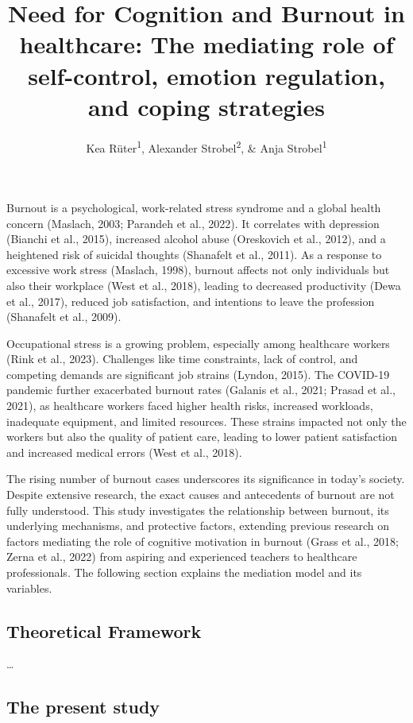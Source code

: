 \documentclass[
  man]{apa6}
\title{Need for Cognition and Burnout in healthcare: The mediating role of self-control, emotion regulation, and coping strategies}
\author{Kea Rüter\textsuperscript{1}, Alexander Strobel\textsuperscript{2}, \& Anja Strobel\textsuperscript{1}}
\date{}
\affiliation{\vspace{0.5cm}\textsuperscript{1} Department of Psychology, Technische Universität Chemnitz, Chemnitz, Germany\\\textsuperscript{2} Faculty of Psychology, Technische Universität Dresden, Dresden, Germany}
\begin{document}
\maketitle

Burnout is a psychological, work-related stress syndrome and a global health concern (Maslach, 2003; Parandeh et al., 2022).
It correlates with depression (Bianchi et al., 2015), increased alcohol abuse (Oreskovich et al., 2012), and a heightened risk of suicidal thoughts (Shanafelt et al., 2011).
As a response to excessive work stress (Maslach, 1998), burnout affects not only individuals but also their workplace (West et al., 2018), leading to decreased productivity (Dewa et al., 2017), reduced job satisfaction, and intentions to leave the profession (Shanafelt et al., 2009).

Occupational stress is a growing problem, especially among healthcare workers (Rink et al., 2023).
Challenges like time constraints, lack of control, and competing demands are significant job strains (Lyndon, 2015).
The COVID-19 pandemic further exacerbated burnout rates (Galanis et al., 2021; Prasad et al., 2021), as healthcare workers faced higher health risks, increased workloads, inadequate equipment, and limited resources.
These strains impacted not only the workers but also the quality of patient care, leading to lower patient satisfaction and increased medical errors (West et al., 2018).

The rising number of burnout cases underscores its significance in today's society.
Despite extensive research, the exact causes and antecedents of burnout are not fully understood.
This study investigates the relationship between burnout, its underlying mechanisms, and protective factors, extending previous research on factors mediating the role of cognitive motivation in burnout (Grass et al., 2018; Zerna et al., 2022) from aspiring and experienced teachers to healthcare professionals.
The following section explains the mediation model and its variables.

\subsection{Theoretical Framework}\label{theoretical-framework}

\ldots{}

\subsection{The present study}\label{the-present-study}
\end{document}
